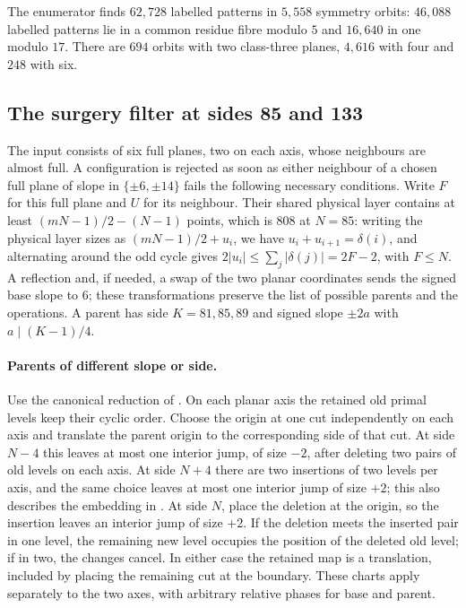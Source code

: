 \documentclass[11pt,colorlinks]{charlie}
\begin{document}
The enumerator finds $62{,}728$ labelled patterns in $5{,}558$ symmetry orbits: $46{,}088$ labelled patterns lie in a common residue fibre modulo $5$ and $16{,}640$ in one modulo $17$. There are $694$ orbits with two class-three planes, $4{,}616$ with four and $248$ with six.

\subsection{The surgery filter at sides 85 and 133}\label{sec:surgery}
The input consists of six full planes, two on each axis, whose neighbours are almost full. A configuration is rejected as soon as either neighbour of a chosen full plane of slope in $\{\pm6,\pm14\}$ fails the following necessary conditions. Write $F$ for this full plane and $U$ for its neighbour. Their shared physical layer contains at least $(mN-1)/2-(N-1)$ points, which is $808$ at $N=85$: writing the physical layer sizes as $(mN-1)/2+u_i$, we have $u_i+u_{i+1}=\delta(i)$, and alternating around the odd cycle gives $2|u_i|\le\sum_j|\delta(j)|=2F-2$, with $F\le N$. A reflection and, if needed, a swap of the two planar coordinates sends the signed base slope to $6$; these transformations preserve the list of possible parents and the operations. A parent has side $K=81,85,89$ and signed slope $\pm2a$ with $a\mid(K-1)/4$.

\paragraph{Parents of different slope or side.}
Use the canonical reduction of \cite[Section~3.2]{BHNlong}. On each planar axis the retained old primal levels keep their cyclic order. Choose the origin at one cut independently on each axis and translate the parent origin to the corresponding side of that cut. At side $N-4$ this leaves at most one interior jump, of size $-2$, after deleting two pairs of old levels on each axis. At side $N+4$ there are two insertions of two levels per axis, and the same choice leaves at most one interior jump of size $+2$; this also describes the embedding in . At side $N$, place the deletion at the origin, so the insertion leaves an interior jump of size $+2$. If the deletion meets the inserted pair in one level, the remaining new level occupies the position of the deleted old level; if in two, the changes cancel. In either case the retained map is a translation, included by placing the remaining cut at the boundary. These charts apply separately to the two axes, with arbitrary relative phases for base and parent.
\end{document}
